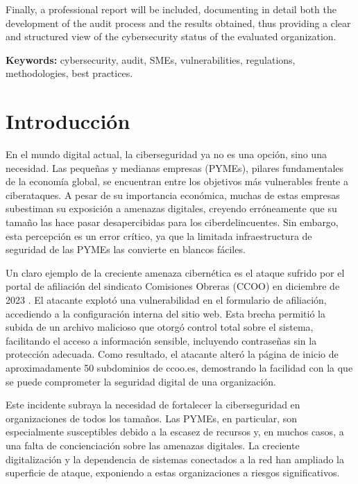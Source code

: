 \documentclass[a4paper, 10pt]{article}
\begin{document}
Finally, a professional report will be included, documenting in detail both the development of the audit process and the results obtained, thus providing a clear and structured view of the cybersecurity status of the evaluated organization.

\par\vspace{0.5cm}
\textbf{Keywords:} cybersecurity, audit, SMEs, vulnerabilities, regulations, methodologies, best practices.
\clearpage


\section{Introducción}
En el mundo digital actual, la ciberseguridad ya no es una opción, sino una necesidad. Las pequeñas y medianas empresas (PYMEs), pilares fundamentales de la economía global, se encuentran entre los objetivos más vulnerables frente a ciberataques. A pesar de su importancia económica, 
muchas de estas empresas subestiman su exposición a amenazas digitales, creyendo erróneamente que su tamaño las hace pasar desapercibidas para los ciberdelincuentes. Sin embargo, esta percepción es un error crítico, ya que la limitada infraestructura de seguridad de las 
PYMEs las convierte en blancos fáciles. 
\par\vspace{0.5cm}

Un claro ejemplo de la creciente amenaza cibernética es el ataque sufrido por el portal de afiliación del sindicato Comisiones Obreras (CCOO) en diciembre de 2023 \cite{farlopa}. El atacante explotó una vulnerabilidad en el formulario de afiliación, accediendo a la configuración interna del sitio web. Esta brecha permitió la subida de un archivo malicioso que otorgó control total sobre el sistema, facilitando el acceso a información sensible, incluyendo contraseñas sin la protección adecuada. Como resultado, el atacante alteró la página de inicio de aproximadamente 50 subdominios de ccoo.es, demostrando la facilidad con la que se puede comprometer la seguridad digital de una organización.
\par\vspace{0.5cm}

Este incidente subraya la necesidad de fortalecer la ciberseguridad en organizaciones de todos los tamaños. Las PYMEs, en particular, son especialmente susceptibles debido a la escasez de recursos y, en muchos casos, a una falta de concienciación sobre las amenazas digitales. 
La creciente digitalización y la dependencia de sistemas conectados a la red han ampliado la superficie de ataque, exponiendo a estas organizaciones a riesgos significativos.
\par\vspace{0.5cm}
\end{document}
